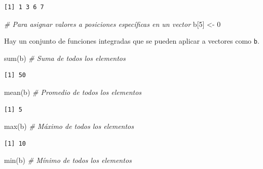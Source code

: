 \documentclass[
  12pt,
  spanish,
]{book}
\newenvironment{Shaded}{\begin{snugshade}}{\end{snugshade}}
\newcommand{\CommentTok}[1]{\textcolor[rgb]{0.56,0.35,0.01}{\textit{#1}}}
\newcommand{\DecValTok}[1]{\textcolor[rgb]{0.00,0.00,0.81}{#1}}
\newcommand{\FunctionTok}[1]{\textcolor[rgb]{0.00,0.00,0.00}{#1}}
\newcommand{\NormalTok}[1]{#1}
\newcommand{\OtherTok}[1]{\textcolor[rgb]{0.56,0.35,0.01}{#1}}
\begin{document}
\begin{verbatim}
[1] 1 3 6 7
\end{verbatim}

\begin{Shaded}
\begin{Highlighting}[]
\CommentTok{\# Para asignar valores a posiciones específicas en un vector}
\NormalTok{b[}\DecValTok{5}\NormalTok{] }\OtherTok{\textless{}{-}} \DecValTok{0}
\end{Highlighting}
\end{Shaded}

Hay un conjunto de funciones integradas que se pueden aplicar a vectores como \texttt{b}.

\begin{Shaded}
\begin{Highlighting}[]
\FunctionTok{sum}\NormalTok{(b) }\CommentTok{\# Suma de todos los elementos}
\end{Highlighting}
\end{Shaded}

\begin{verbatim}
[1] 50
\end{verbatim}

\begin{Shaded}
\begin{Highlighting}[]
\FunctionTok{mean}\NormalTok{(b) }\CommentTok{\# Promedio de todos los elementos}
\end{Highlighting}
\end{Shaded}

\begin{verbatim}
[1] 5
\end{verbatim}

\begin{Shaded}
\begin{Highlighting}[]
\FunctionTok{max}\NormalTok{(b) }\CommentTok{\# Máximo de todos los elementos}
\end{Highlighting}
\end{Shaded}

\begin{verbatim}
[1] 10
\end{verbatim}

\begin{Shaded}
\begin{Highlighting}[]
\FunctionTok{min}\NormalTok{(b) }\CommentTok{\# Mínimo de todos los elementos}
\end{Highlighting}
\end{Shaded}
\end{document}

